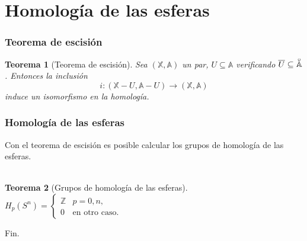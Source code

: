 \documentclass{beamer}
\def\X{{\mathbb X}}
\def\A{{\mathbb A}}
\newcommand{\interior}[1]{\accentset{\smash{\raisebox{-0.12ex}{$\scriptstyle\circ$}}}{#1}\rule{0pt}{2.3ex}}
\theoremstyle{theorem}
\newtheorem{mytheorem}{Teorema}
\begin{document}

\section{Homología de las esferas}



\begin{frame}
  \frametitle{Teorema de escisión}
  \begin{mytheorem}[Teorema de escisión]
    Sea $(\X, \A)$ un par, $U \subseteq \A$ verificando $\overline{U} \subseteq \interior{\A}$.
    Entonces la inclusión
    \[ i \colon (\X - U, \A - U) \to (\X, \A) \]
    induce un isomorfismo en la homología.
  \end{mytheorem}
\end{frame}


\begin{frame}
  \frametitle{Homología de las esferas}
  Con el teorema de escisión es posible calcular los grupos de homología de las esferas. \\~\\

  \begin{mytheorem}[Grupos de homología de las esferas]
    $H_p(S^n) = \begin{cases} \mathbb Z & p = 0, n,\\
                                      0 & \text{en otro caso.} \end{cases}$
  \end{mytheorem}
\end{frame}



\begin{frame}
\Huge{\centerline{Fin.}}
\end{frame}


\end{document}
